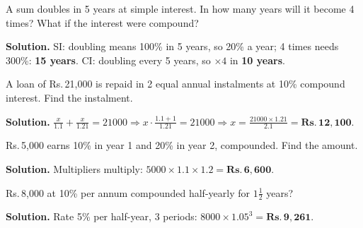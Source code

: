 \documentclass[11pt,a4paper,openany]{report}
\newcommand{\Rs}{Rs.\,}
\begin{document}
\begin{example}
A sum doubles in 5 years at simple interest. In how many years will it become 4 times? What if the interest were compound?

\textbf{Solution.} SI: doubling means 100\% in 5 years, so 20\% a year; 4 times needs 300\%: \textbf{15 years}.
CI: doubling every 5 years, so $\times4$ in \textbf{10 years}.
\end{example}

\begin{example}
A loan of \Rs21,000 is repaid in 2 equal annual instalments at 10\% compound interest. Find the instalment.

\textbf{Solution.} $\frac x{1.1}+\frac x{1.21}=21000\Rightarrow x\cdot\frac{1.1+1}{1.21}=21000\Rightarrow x=\frac{21000\times1.21}{2.1}=\mathbf{\Rs12,100}$.
\end{example}
\begin{example}
\Rs5,000 earns 10\% in year 1 and 20\% in year 2, compounded. Find the amount.

\textbf{Solution.} Multipliers multiply: $5000\times1.1\times1.2=\mathbf{\Rs6,600}$.
\end{example}

\begin{example}
\Rs8,000 at 10\% per annum compounded half-yearly for $1\frac12$ years?

\textbf{Solution.} Rate 5\% per half-year, 3 periods: $8000\times1.05^3=\mathbf{\Rs9,261}$.
\end{example}
\end{document}
